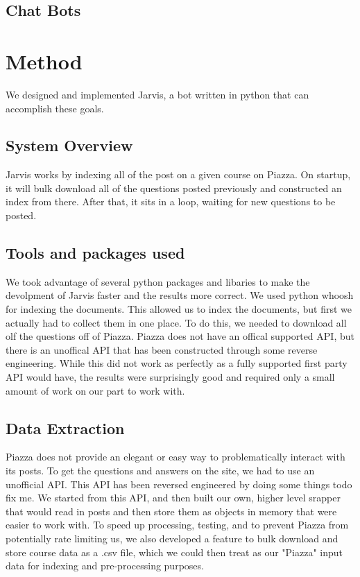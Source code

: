 \documentclass[sigconf]{acmart}
\begin{document}
\subsection{Chat Bots}

\section{Method}
We designed and implemented Jarvis, a bot written in python that can accomplish these goals. 

\subsection{System Overview}
Jarvis works by indexing all of the post on a given course on Piazza. On startup, it will bulk download all of the questions posted previously and constructed an index from there. After that, it sits in a loop, waiting for new questions to be posted. 

\subsection{Tools and packages used}
We took advantage of several python packages and libaries to make the devolpment of Jarvis faster and the results more correct. We used python whoosh for indexing the documents. This allowed us to index the documents, but first we actually had to collect them in one place. To do this, we needed to download all olf the questions off of Piazza. Piazza does not have an offical supported API, but there is an unoffical API that has been constructed through some reverse engineering. While this did not work as perfectly as a fully supported first party API would have, the results were surprisingly good and required only a small amount of work on our part to work with.

\subsection{Data Extraction}
Piazza does not provide an elegant or easy way to problematically interact with its posts. To get the questions and answers on the site, we had to use an unofficial API. This API has been reversed engineered by doing some things todo fix me. We started from this API, and then built our own, higher level srapper that would read in posts and then store them as objects in memory that were easier to work with. To speed up processing, testing, and to prevent Piazza from potentially rate limiting us, we also developed a feature to bulk download and store course data as a .csv file, which we could then treat as our "Piazza" input data for indexing and pre-processing purposes.
\end{document}
